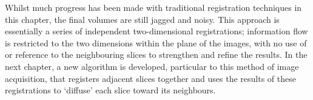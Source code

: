 	Whilst much progress has been made with traditional registration techniques in this chapter, the final volumes are still jagged and noisy. This approach is essentially a series of independent two-dimensional registrations; information flow is restricted to the two dimensions within the plane of the images, with no use of or reference to the neighbouring slices to strengthen and refine the results. In the next chapter, a new algorithm is developed, particular to this method of image acquisition, that registers adjacent slices together and uses the results of these registrations to `diffuse' each slice toward its neighbours.

